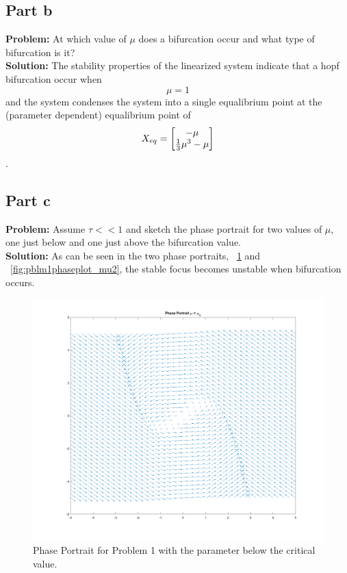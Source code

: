 \documentclass[letter]{article}
\numberwithin{equation}{section}
\begin{document}
\newpage
\subsection{Part b}
\textbf{Problem:}
At which value of $\mu$ does a bifurcation occur and what type of bifurcation is it?\\

\noindent
\textbf{Solution:}
The stability properties of the linearized system indicate that a hopf bifurcation occur when $$\mu = 1$$ and the system condenses the system into a single equalibrium point at the (parameter dependent) equalibrium point of $$X_{eq} = \mqty[-\mu\\\frac{1}{3}\mu^3 - \mu]$$.

\newpage
\subsection{Part c}
\textbf{Problem:}
Assume $\tau << 1$ and sketch the phase portrait for two values of $\mu$, one just below and one just above the bifurcation value.\\

\noindent
\textbf{Solution:}
As can be seen in the two phase portraits, \figurename \ \ref{fig:pblm1phaseplot_mu01} and \figurename \ \ref{fig:pblm1phaseplot_mu2}, the stable focus becomes unstable when bifurcation occurs.

\begin{figure}[h]
	\centering
	\includegraphics[width=\linewidth]{fig/pblm1_phaseplot_mu01}
	\caption{Phase Portrait for Problem 1 with the parameter below the critical value.}
	\label{fig:pblm1phaseplot_mu01}
\end{figure}
\end{document}
